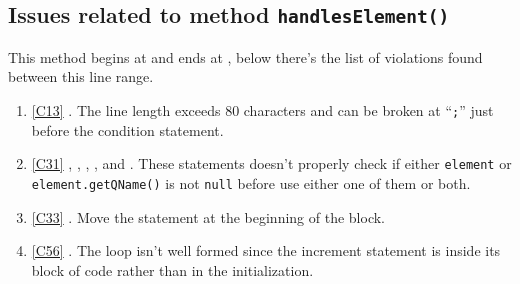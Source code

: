 \subsection{Issues related to method \texttt{handlesElement()}}
This method begins at  and ends at , below there's the list of violations found between this line range.
\begin{enumerate}
	\item \ref{C13} . The line length exceeds 80 characters and can be broken at ``\texttt{;}'' just before the condition statement. 	
	\item \ref{C31} , , , ,  and . These statements doesn't properly check if either \texttt{element} or \texttt{element.getQName()} is not \texttt{null} before use either one of them or both.
	\item \ref{C33} . Move the statement at the beginning of the block.
	\item \ref{C56} . The loop isn't well formed since the increment statement is inside its block of code rather than in the initialization. 
\end{enumerate}

